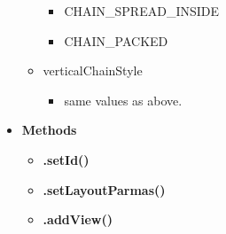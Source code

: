 \documentclass{report}
\begin{document}
\begin{itemize}
\begin{itemize}
\begin{itemize}
                        \item CHAIN\_SPREAD\_INSIDE
                        \item CHAIN\_PACKED
                    \end{itemize}
                \item verticalChainStyle
                    \begin{itemize}
                        \item same values as above.
                    \end{itemize}
            \end{itemize}
        \item \textbf{Methods}
            \begin{itemize}
                \item \textbf{.setId()}
                \item \textbf{.setLayoutParmas()}
                \item \textbf{.addView()}
            \end{itemize}
    \end{itemize}

    \pagebreak 
\end{document}

